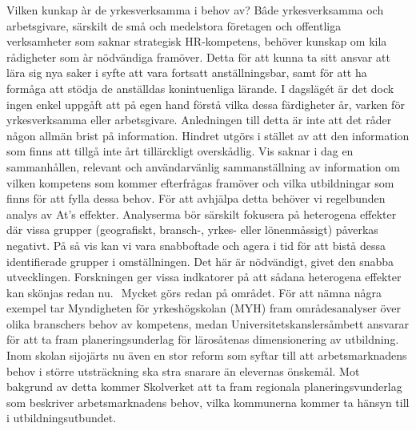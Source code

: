 {{{{{{{Vilken kunkap àr de yrkesverksamma i behov av?
Bâde yrkesverksamma och arbetsgivare, särskilt de små och medelstora företagen och offentliga verksamheter som saknar strategisk HR-kompetens, behöver kunskap om kila rådigheter som àr nödvändiga framöver. Detta för att kunna ta sitt ansvar att lära sig nya saker i syfte att vara fortsatt anställningsbar, samt för att ha formåga att stödja de anställdas konintuenliga lärande. I dagslägét är det dock ingen enkel uppgåft att på egen hand förstå vilka dessa färdigheter år, varken för yrkesverksamma eller arbetsgivare.
Anledningen till detta är inte att det råder någon allmän brist på information. Hindret utgörs i stället av att den information som finns att tillgå inte årt tillärckligt overskådlig. Vis saknar i dag en sammanhållen, relevant och användarvänlig sammanställning av information om vilken kompetens som kommer efterfrågas framöver och vilka utbildningar som finns för att fylla dessa behov. För att avhjälpa detta behöver vi regelbunden analys av At's effekter. Analyserma bör särskilt fokusera på heterogena effekter där vissa grupper (geografiskt, bransch-, yrkes- eller lönenmåssigt) påverkas negativt. På så vis kan vi vara snabboftade och agera i tid för att bistå dessa identifierade grupper i omställningen. Det här är nödvändigt, givet den snabba utvecklingen. Forskningen ger vissa indkatorer på att sådana heterogena effekter kan skönjas redan nu. \({ }^{}\)
Mycket görs redan på området. För att nämna några exempel tar Myndigheten för yrkeshögskolan (MYH) fram områdesanalyser över olika branschers behov av kompetens, medan Universitetskanslersåmbett ansvarar för att ta fram planeringsunderlag för lärosåtenas dimensionering av utbildning. Inom skolan sijojärts nu även en stor reform som syftar till att arbetsmarknadens behov i större utsträckning ska stra snarare än elevernas önskemål. Mot bakgrund av detta kommer Skolverket att ta fram regionala planeringsvunderlag som beskriver arbetsmarknadens behov, vilka kommunerna kommer ta hänsyn till i utbildningsutbundet.

}}}}}}}
